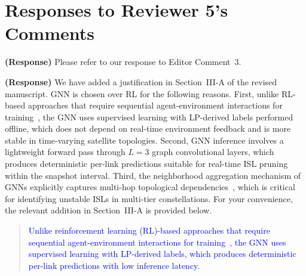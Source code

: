 \documentclass[letter]{article}
\begin{document}
\newpage
\vspace{0.1cm} \noindent
\section*{\large Responses to Reviewer 5's Comments}

\noindent {}

\vspace{5mm}
{\bf (Response)}
Please refer to our response to Editor Comment~3.

\vspace{10mm}
\noindent {}

\vspace{5mm}
{\bf (Response)}
We have added a justification in Section~III-A of the revised manuscript. GNN is chosen over RL for the following reasons. First, unlike RL-based approaches that require sequential agent-environment interactions for training~\cite{rao2025dynamic}, the GNN uses supervised learning with LP-derived labels performed offline, which does not depend on real-time environment feedback and is more stable in time-varying satellite topologies. Second, GNN inference involves a lightweight forward pass through $L=3$ graph convolutional layers, which produces deterministic per-link predictions suitable for real-time ISL pruning within the snapshot interval. Third, the neighborhood aggregation mechanism of GNNs explicitly captures multi-hop topological dependencies~\cite{rao2025dynamic}, which is critical for identifying unstable ISLs in multi-tier constellations. For your convenience, the relevant addition in Section~III-A is provided below.

\begin{quote}
\textcolor{blue}{Unlike reinforcement learning (RL)-based approaches that require sequential agent-environment interactions for training~\cite{rao2025dynamic}, the GNN uses supervised learning with LP-derived labels, which produces deterministic per-link predictions with low inference latency.}
\end{quote}

\vspace{10mm}
\noindent {}
\end{document}
